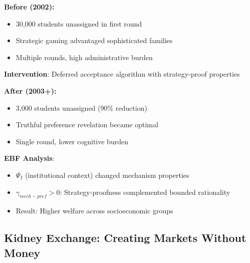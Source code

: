 \begin{tcolorbox}[colback=green!5!white,colframe=green!75!black,title=Worked Example: NYC High School Match]
\textbf{Before (2002):}
\begin{itemize}
    \item 30,000 students unassigned in first round
    \item Strategic gaming advantaged sophisticated families
    \item Multiple rounds, high administrative burden
\end{itemize}

\textbf{Intervention}: Deferred acceptance algorithm with strategy-proof properties

\textbf{After (2003+):}
\begin{itemize}
    \item 3,000 students unassigned (90\% reduction)
    \item Truthful preference revelation became optimal
    \item Single round, lower cognitive burden
\end{itemize}

\textbf{EBF Analysis}:
\begin{itemize}
    \item $\Psi_I$ (institutional context) changed mechanism properties
    \item $\gamma_{mech-pref} > 0$: Strategy-proofness complemented bounded rationality
    \item Result: Higher welfare across socioeconomic groups
\end{itemize}
\end{tcolorbox}

\subsection{Kidney Exchange: Creating Markets Without Money}

